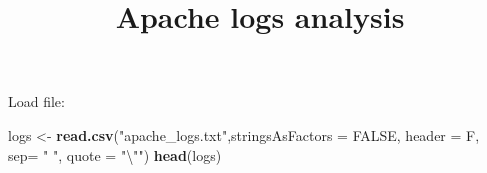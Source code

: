 \documentclass[]{article}
\title{Apache logs analysis}
\author{}
\date{}
\newenvironment{Shaded}{\begin{snugshade}}{\end{snugshade}}
\newcommand{\CharTok}[1]{\textcolor[rgb]{0.31,0.60,0.02}{#1}}
\newcommand{\DataTypeTok}[1]{\textcolor[rgb]{0.13,0.29,0.53}{#1}}
\newcommand{\KeywordTok}[1]{\textcolor[rgb]{0.13,0.29,0.53}{\textbf{#1}}}
\newcommand{\NormalTok}[1]{#1}
\newcommand{\OtherTok}[1]{\textcolor[rgb]{0.56,0.35,0.01}{#1}}
\newcommand{\StringTok}[1]{\textcolor[rgb]{0.31,0.60,0.02}{#1}}
\begin{document}
\maketitle

Load file:

\begin{Shaded}
\begin{Highlighting}[]
\NormalTok{logs <-}\StringTok{ }\KeywordTok{read.csv}\NormalTok{(}\StringTok{"apache_logs.txt"}\NormalTok{,}\DataTypeTok{stringsAsFactors =} \OtherTok{FALSE}\NormalTok{, }\DataTypeTok{header =}\NormalTok{ F, }\DataTypeTok{sep=} \StringTok{" "}\NormalTok{, }\DataTypeTok{quote =} \StringTok{"}\CharTok{\textbackslash{}"}\StringTok{"}\NormalTok{)}
\KeywordTok{head}\NormalTok{(logs)}
\end{Highlighting}
\end{Shaded}
\end{document}
